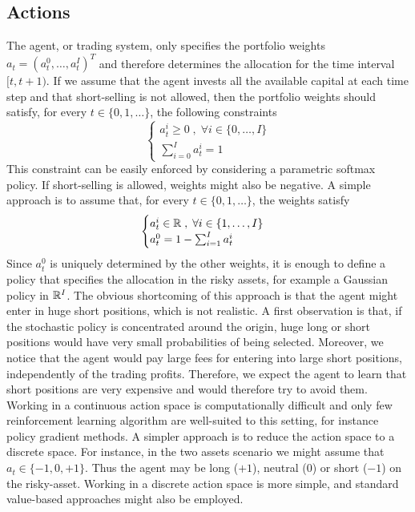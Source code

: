 \subsection{Actions}
The agent, or trading system, only specifies the portfolio weights $a_t = (a_t^0,
\ldots, a_t^I)^T$ and therefore determines the allocation for the time interval
$[t, t+1)$. If we assume that the agent invests all the available capital at each time
step and that short-selling is not allowed, then the portfolio weights should
satisfy, for every $t \in \{0, 1, \ldots\}$, the following constraints
\begin{equation}
	\begin{cases}
		a_t^i \geq 0 \;,\; \forall i \in \{0, \ldots, I\}\\
		\sum^{I}_{i=0} a_t^i = 1 
	\end{cases}
\end{equation}
This constraint can be easily enforced by considering a parametric softmax 
policy. If short-selling is allowed, weights might also be negative. A simple approach is to assume that, for every $t \in \{0, 1, \ldots\}$, the weights satisfy
\begin{equation}
	\begin{cases}
		a_t^i \in \mathbb{R} \;,\; \forall i \in \{1, \ldots, I\}\\
		a_t^0 = 1 - \sum^{I}_{i=1} a_t^i
	\end{cases}
\end{equation}
Since $a_t^0$ is uniquely determined by the other weights, it is enough to
define a policy that specifies the allocation in the risky assets, for example a
Gaussian policy in $\mathbb{R}^I$. The obvious shortcoming of this approach is that
the agent might enter in huge short positions, which is not realistic. A first
observation is that, if the stochastic policy is concentrated around the
origin, huge long or short positions would have very small probabilities of 
being selected. Moreover, we notice that the agent would pay large fees for 
entering into large short positions, independently of the trading profits. 
Therefore, we expect the agent to learn that short positions are very expensive 
and would therefore try to avoid them.\\
Working in a continuous action space is computationally difficult and only few
reinforcement learning algorithm are well-suited to this setting, for instance policy
gradient methods. A simpler approach is to reduce the action space to a discrete 
space. For instance, in the two assets scenario we might assume that $a_t \in
\{-1, 0, +1\}$. Thus the agent may be long ($+1$), neutral ($0$) or short
($-1$) on the risky-asset. Working in a discrete action space is more simple,
and standard value-based approaches might also be employed. 
